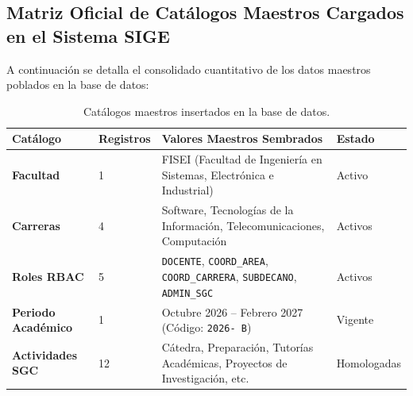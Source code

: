 \documentclass[12pt,a4paper]{article}
\begin{document}
\subsection{Matriz Oficial de Catálogos Maestros Cargados en el Sistema SIGE}
A continuación se detalla el consolidado cuantitativo de los datos maestros poblados en la base de datos:
\begin{table}[H]
\centering
\small
\renewcommand{\arraystretch}{1.2}
\begin{tabularx}{\textwidth}{|>{\hsize=0.8\hsize\raggedright\arraybackslash\bfseries\footnotesize}X|>{\hsize=0.4\hsize\centering\arraybackslash\footnotesize}X|>{\hsize=2.2\hsize\raggedright\arraybackslash\footnotesize}X|>{\hsize=0.6\hsize\centering\arraybackslash\footnotesize}X|}
\hline
\rowcolor{tableheader}
\textbf{Catálogo} & \textbf{Registros} & \textbf{Valores Maestros Sembrados} & \textbf{Estado} \\
\hline
Facultad & 1 & FISEI (Facultad de Ingeniería en Sistemas, Electrónica e Industrial) & Activo \\
\hline
Carreras & 4 & Software, Tecnologías de la Información, Telecomunicaciones, Computación & Activos \\
\hline
Roles RBAC & 5 & \texttt{DOCENTE}, \texttt{COORD\_\allowbreak  AREA}, \texttt{COORD\_\allowbreak  CARRERA}, \texttt{SUBDECANO}, \texttt{ADMIN\_\allowbreak  SGC} & Activos \\
\hline
Periodo Académico & 1 & Octubre 2026 -- Febrero 2027 (Código: \texttt{2026- B}) & Vigente \\
\hline
Actividades SGC & 12 & Cátedra, Preparación, Tutorías Académicas, Proyectos de Investigación, etc. & Homologadas \\
\hline
\end{tabularx}
\caption{Catálogos maestros insertados en la base de datos.}
\label{tab:seed_matrix}
\end{table}
\end{document}
